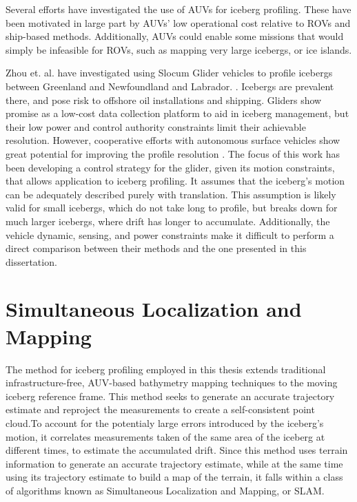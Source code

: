 Several efforts have investigated the use of AUVs for iceberg profiling. These have been motivated in large part by AUVs' low operational cost relative to ROVs and ship-based methods. Additionally, AUVs could enable some missions that would simply be infeasible for ROVs, such as mapping very large icebergs, or ice islands. 

Zhou et. al. have investigated using Slocum Glider vehicles to profile icebergs between Greenland and Newfoundland and Labrador. \cite{Zhou2014}. Icebergs are prevalent there, and pose risk to offshore oil installations and shipping. Gliders show promise as a low-cost data collection platform to aid in iceberg management, but their low power and control authority constraints limit their achievable resolution. However, cooperative efforts with autonomous surface vehicles show great potential for improving the profile resolution \cite{Smith2014}. The focus of this work has been developing a control strategy for the glider, given its motion constraints, that allows application to iceberg profiling. It assumes that the iceberg's motion can be adequately described purely with translation. This assumption is likely valid for small icebergs, which do not take long to profile, but breaks down for much larger icebergs, where drift has longer to accumulate. Additionally, the vehicle dynamic, sensing, and power constraints make it difficult to perform a direct comparison between their methods and the one presented in this dissertation. 




\section{Simultaneous Localization and Mapping}

The method for iceberg profiling employed in this thesis extends traditional infrastructure-free, AUV-based bathymetry mapping techniques to the moving iceberg reference frame. This method seeks to generate an accurate trajectory estimate and reproject the measurements to create a self-consistent point cloud.To account for the potentialy large errors introduced by the iceberg's motion, it correlates measurements taken of the same area of the iceberg at different times, to estimate the accumulated drift. Since this method uses terrain information to generate an accurate trajectory estimate, while at the same time using its trajectory estimate to build a map of the terrain, it falls within a class of algorithms known as Simultaneous Localization and Mapping, or SLAM.

